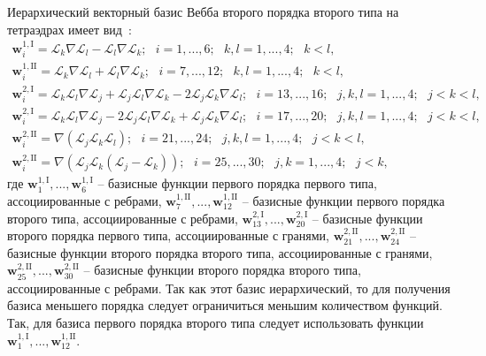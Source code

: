 \documentclass[a4paper,14pt]{article}
\begin{document}
Иерархический векторный базис Вебба второго порядка второго типа на тетраэдрах имеет вид~\citep{mikhajlova}:
\begin{equation}
	\begin{matrix}
		\displaystyle
		\mathbf{w}_{i}^{1,\mathrm{I}} = \mathcal{L}_k \nabla \mathcal{L}_l - \mathcal{L}_l \nabla \mathcal{L}_k ;
		\scriptstyle
		\text{~~} i = 1, ..., 6 ; \text{~~} k, l = 1, ..., 4 ; \text{~~} k < l ,\\
		\displaystyle
		\mathbf{w}_{i}^{1,\mathrm{II}} = \mathcal{L}_k \nabla \mathcal{L}_l + \mathcal{L}_l \nabla \mathcal{L}_k ;
		\scriptstyle
		\text{~~} i = 7, ..., 12 ; \text{~~} k, l = 1, ..., 4 ; \text{~~} k < l ,\\
		\displaystyle
		\mathbf{w}_{i}^{2,\mathrm{I}} = \mathcal{L}_k \mathcal{L}_l \nabla \mathcal{L}_j + \mathcal{L}_j \mathcal{L}_l \nabla \mathcal{L}_k - 2 \mathcal{L}_j \mathcal{L}_k \nabla \mathcal{L}_l ;
		\scriptstyle
		\text{~~} i = 13, ..., 16 ; \text{~~} j, k, l = 1, ..., 4 ; \text{~~} j < k < l ,\\
		\displaystyle
		\mathbf{w}_{i}^{2,\mathrm{I}} = \mathcal{L}_k \mathcal{L}_l \nabla \mathcal{L}_j - 2 \mathcal{L}_j \mathcal{L}_l \nabla \mathcal{L}_k + \mathcal{L}_j \mathcal{L}_k \nabla \mathcal{L}_l ;
		\scriptstyle
		\text{~~} i = 17, ..., 20 ; \text{~~} j, k, l = 1, ..., 4 ; \text{~~} j < k < l ,\\
		\displaystyle
		\mathbf{w}_{i}^{2,\mathrm{II}} = \nabla ( \mathcal{L}_j \mathcal{L}_k \mathcal{L}_l ) ;
		\scriptstyle
		\text{~~} i = 21, ..., 24 ; \text{~~} j, k, l = 1, ..., 4 ; \text{~~} j < k < l ,\\
		\displaystyle
		\mathbf{w}_{i}^{2,\mathrm{II}} = \nabla ( \mathcal{L}_j \mathcal{L}_k ( \mathcal{L}_j - \mathcal{L}_k ) ) ;
		\scriptstyle
		\text{~~} i = 25, ..., 30 ; \text{~~} j, k = 1, ..., 4 ; \text{~~} j < k ,
	\end{matrix}
	\label{eq:basis}
\end{equation}
где $\mathbf{w}_{1}^{1,\mathrm{I}}, ..., \mathbf{w}_{6}^{1,\mathrm{I}}$ -- базисные функции первого порядка первого типа, ассоциированные с ребрами, $\mathbf{w}_{7}^{1,\mathrm{II}}, ..., \mathbf{w}_{12}^{1,\mathrm{II}}$ -- базисные функции первого порядка второго типа, ассоциированные с ребрами, $\mathbf{w}_{13}^{2,\mathrm{I}}, ..., \mathbf{w}_{20}^{2,\mathrm{I}}$ -- базисные функции второго порядка первого типа, ассоциированные с гранями, $\mathbf{w}_{21}^{2,\mathrm{II}}, ..., \mathbf{w}_{24}^{2,\mathrm{II}}$ -- базисные функции второго порядка второго типа, ассоциированные с гранями, $\mathbf{w}_{25}^{2,\mathrm{II}}, ..., \mathbf{w}_{30}^{2,\mathrm{II}}$ -- базисные функции второго порядка второго типа, ассоциированные с ребрами. Так как этот базис иерархический, то для получения базиса меньшего порядка следует ограничиться меньшим количеством функций. Так, для базиса первого порядка второго  типа следует использовать функции $\mathbf{w}_{1}^{1,\mathrm{I}}, ..., \mathbf{w}_{12}^{1,\mathrm{II}}$.
\end{document}
